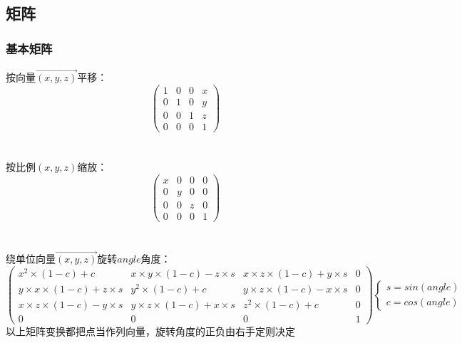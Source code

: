 \subsection{矩阵}
	\subsubsection{基本矩阵}
	按向量$\overrightarrow{(x,y,z)}$平移：
	\[\begin{pmatrix}
	1 & 0 & 0 & x\\ 
	0 & 1 & 0 & y\\ 
	0 & 0 & 1 & z\\ 
	0 & 0 & 0 & 1
	\end{pmatrix}\]\\
	\\
	按比例$(x,y,z)$缩放：
	\[\begin{pmatrix}
	x & 0 & 0 & 0\\ 
	0 & y & 0 & 0\\ 
	0 & 0 & z & 0\\ 
	0 & 0 & 0 & 1
	\end{pmatrix}\]\\
	\\
	绕单位向量$\overrightarrow{(x,y,z)}$旋转$angle$角度：
	\[\begin{pmatrix}
	x^2\times (1-c)+c & x\times y\times (1-c)-z\times s & x\times z\times (1-c)+y\times s & 0\\ 
	y\times x\times (1-c)+z\times s & y^2\times (1-c)+c & y\times z\times (1-c)-x\times s & 0\\ 
	x\times z\times (1-c)-y\times s & y\times z\times (1-c)+x\times s & z^2\times (1-c)+c & 0\\ 
	0 & 0 & 0 & 1
	\end{pmatrix}
	\begin{cases}
	s=sin(angle)\\
	c=cos(angle)
	\end{cases}\]
	以上矩阵变换都把点当作列向量，旋转角度的正负由右手定则决定\\
	
